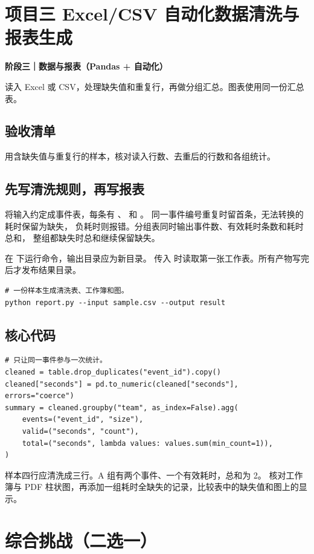 \chapter*{项目三 Excel/CSV 自动化数据清洗与报表生成}

\textbf{阶段三｜数据与报表（Pandas + 自动化）}

读入 Excel 或 CSV，处理缺失值和重复行，再做分组汇总。图表使用同一份汇总表。

\section*{验收清单}
用含缺失值与重复行的样本，核对读入行数、去重后的行数和各组统计。

\section*{先写清洗规则，再写报表}
将输入约定成事件表，每条有 、 和 。
同一事件编号重复时留首条，无法转换的耗时保留为缺失，
负耗时则报错。分组表同时输出事件数、有效耗时条数和耗时总和，
整组都缺失时总和继续保留缺失。

在  下运行命令，输出目录应为新目录。
传入  时读取第一张工作表。所有产物写完后才发布结果目录。
\begin{lstlisting}[language={},title={\texttt{terminal}}]
# 一份样本生成清洗表、工作簿和图。
python report.py --input sample.csv --output result
\end{lstlisting}

\section*{核心代码}
\begin{lstlisting}[title={\code{report.py 中的汇总}}]
# 只让同一事件参与一次统计。
cleaned = table.drop_duplicates("event_id").copy()
cleaned["seconds"] = pd.to_numeric(cleaned["seconds"], errors="coerce")
summary = cleaned.groupby("team", as_index=False).agg(
    events=("event_id", "size"),
    valid=("seconds", "count"),
    total=("seconds", lambda values: values.sum(min_count=1)),
)
\end{lstlisting}
样本四行应清洗成三行。A 组有两个事件、一个有效耗时，总和为 2。
核对工作簿与 PDF 柱状图，再添加一组耗时全缺失的记录，比较表中的缺失值和图上的显示。

\chapter*{综合挑战（二选一）}

